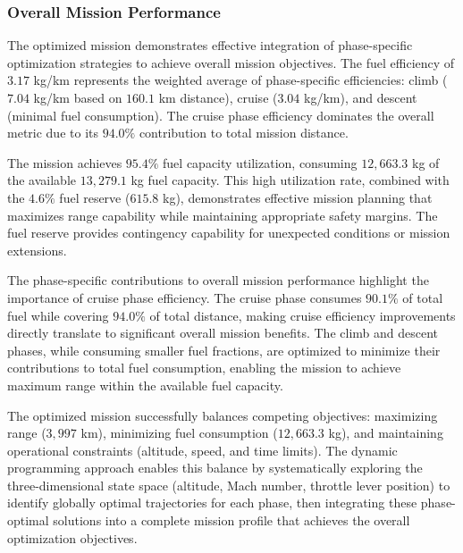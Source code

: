 \subsubsection{Overall Mission Performance}

The optimized mission demonstrates effective integration of phase-specific optimization strategies to achieve overall mission objectives. The fuel efficiency of $3.17$ kg/km represents the weighted average of phase-specific efficiencies: climb ($7.04$ kg/km based on $160.1$ km distance), cruise ($3.04$ kg/km), and descent (minimal fuel consumption). The cruise phase efficiency dominates the overall metric due to its $94.0\%$ contribution to total mission distance.

The mission achieves $95.4\%$ fuel capacity utilization, consuming $12,663.3$ kg of the available $13,279.1$ kg fuel capacity. This high utilization rate, combined with the $4.6\%$ fuel reserve ($615.8$ kg), demonstrates effective mission planning that maximizes range capability while maintaining appropriate safety margins. The fuel reserve provides contingency capability for unexpected conditions or mission extensions.

The phase-specific contributions to overall mission performance highlight the importance of cruise phase efficiency. The cruise phase consumes $90.1\%$ of total fuel while covering $94.0\%$ of total distance, making cruise efficiency improvements directly translate to significant overall mission benefits. The climb and descent phases, while consuming smaller fuel fractions, are optimized to minimize their contributions to total fuel consumption, enabling the mission to achieve maximum range within the available fuel capacity.

The optimized mission successfully balances competing objectives: maximizing range ($3,997$ km), minimizing fuel consumption ($12,663.3$ kg), and maintaining operational constraints (altitude, speed, and time limits). The dynamic programming approach enables this balance by systematically exploring the three-dimensional state space (altitude, Mach number, throttle lever position) to identify globally optimal trajectories for each phase, then integrating these phase-optimal solutions into a complete mission profile that achieves the overall optimization objectives.
